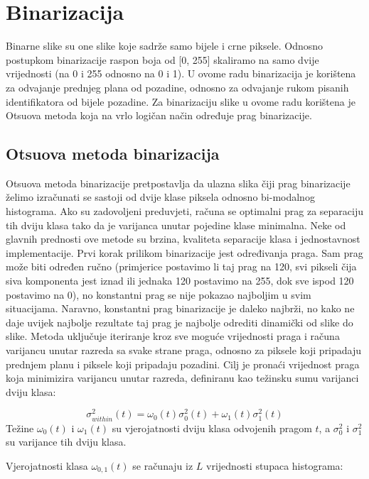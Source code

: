 \documentclass[times, utf8, diplomski]{fer}
\theoremstyle{definition}
\begin{document}
\section{Binarizacija}
Binarne slike su one slike koje sadrže samo bijele i crne piksele. Odnosno postupkom binarizacije raspon boja od [0, 255] skaliramo na samo dvije vrijednosti (na 0 i 255 odnosno na 0 i 1). U ovome radu binarizacija je korištena za odvajanje prednjeg plana od pozadine, odnosno za odvajanje rukom pisanih identifikatora od bijele pozadine. Za binarizaciju slike u ovome radu korištena je Otsuova metoda koja na vrlo logičan način određuje prag binarizacije.
\subsection{Otsuova metoda binarizacija}
Otsuova metoda binarizacije pretpostavlja da ulazna slika čiji prag binarizacije želimo izračunati se sastoji od dvije klase piksela odnosno bi-modalnog histograma. Ako su zadovoljeni preduvjeti, računa se optimalni prag za separaciju tih dviju klasa tako da je varijanca unutar pojedine klase minimalna. Neke od glavnih prednosti ove metode su brzina, kvaliteta separacije klasa i jednostavnost implementacije.
\newline
\newline
Prvi korak prilikom binarizacije jest određivanja praga. Sam prag može biti određen ručno (primjerice postavimo li taj prag na 120, svi pikseli čija siva komponenta jest iznad ili jednaka 120 postavimo na 255, dok sve ispod 120 postavimo na 0), no konstantni prag se nije pokazao najboljim u svim situacijama. Naravno, konstantni prag binarizacije je daleko najbrži, no kako ne daje uvijek najbolje rezultate taj prag je najbolje odrediti dinamički od slike do slike.
Metoda uključuje iteriranje kroz sve moguće vrijednosti praga i računa varijancu unutar razreda sa svake strane praga, odnosno za piksele koji pripadaju prednjem planu i piksele koji pripadaju pozadini. Cilj je pronaći vrijednost praga koja minimizira varijancu unutar razreda, definiranu kao težinsku sumu varijanci dviju klasa:

\begin{equation}
\sigma^2_{within}(t) = \omega_0(t)\sigma_0^2(t) + \omega_1(t)\sigma_1^2(t)
\end{equation}
Težine $\omega_0(t)$ i $\omega_1(t)$ su vjerojatnosti dviju klasa odvojenih pragom $t$, a $\sigma_0^2$ i $\sigma_1^2$ su varijance tih dviju klasa.

Vjerojatnosti klasa $\omega_{0,1}(t)$ se računaju iz $L$ vrijednosti stupaca histograma:
\end{document}
